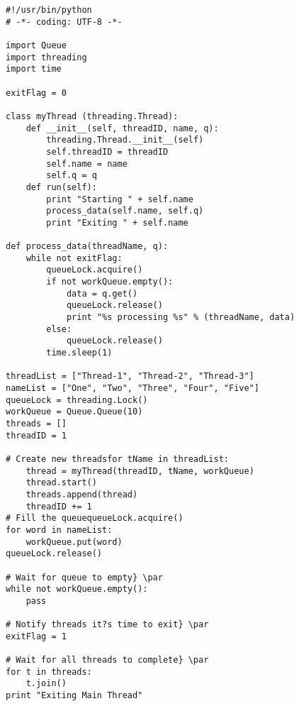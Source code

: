 \documentclass [12pt,a4paper,notitlepage,oneside,bahasa]{article}
\begin{document}
\begin{verbatim}
#!/usr/bin/python
# -*- coding: UTF-8 -*-

import Queue
import threading
import time

exitFlag = 0

class myThread (threading.Thread):
    def __init__(self, threadID, name, q):
        threading.Thread.__init__(self)
        self.threadID = threadID
        self.name = name
        self.q = q
    def run(self):
        print "Starting " + self.name
        process_data(self.name, self.q)
        print "Exiting " + self.name

def process_data(threadName, q):
    while not exitFlag:
        queueLock.acquire()
        if not workQueue.empty():
            data = q.get()
            queueLock.release()
            print "%s processing %s" % (threadName, data)
        else:
            queueLock.release()
        time.sleep(1)

threadList = ["Thread-1", "Thread-2", "Thread-3"]
nameList = ["One", "Two", "Three", "Four", "Five"]
queueLock = threading.Lock()
workQueue = Queue.Queue(10)
threads = []
threadID = 1

# Create new threadsfor tName in threadList:
    thread = myThread(threadID, tName, workQueue)
    thread.start()
    threads.append(thread)
    threadID += 1
# Fill the queuequeueLock.acquire()
for word in nameList:
    workQueue.put(word)
queueLock.release()

# Wait for queue to empty} \par
while not workQueue.empty():
    pass
    
# Notify threads it?s time to exit} \par
exitFlag = 1

# Wait for all threads to complete} \par
for t in threads:
    t.join()
print "Exiting Main Thread"
\end{verbatim}
\end{document}
